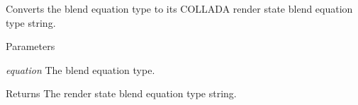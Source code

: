 \label{namespaceFUDaePassStateBlendEquation_a60dc55abbd20eda809e86265a727b151}
Converts the blend equation type to its COLLADA render state blend equation type string. 
\begin{DoxyParams}{Parameters}
\item[{\em equation}]The blend equation type. \end{DoxyParams}
\begin{DoxyReturn}{Returns}
The render state blend equation type string. 
\end{DoxyReturn}
